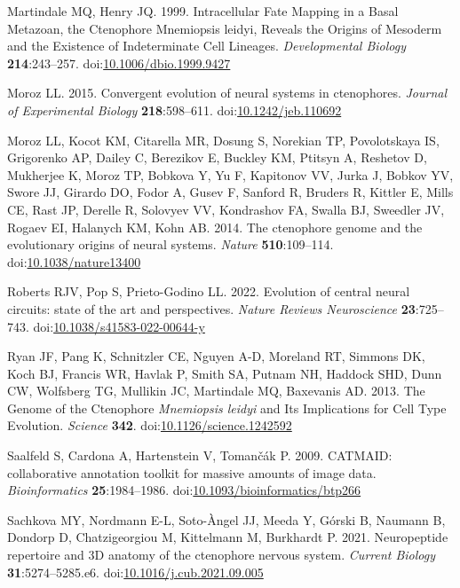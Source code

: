 \documentclass[
  11pt,
]{article}
\newlength{\cslhangindent}
\newenvironment{CSLReferences}[2] %
 {\begin{list}{}{%
  \setlength{\itemindent}{0pt}
  \setlength{\leftmargin}{0pt}
  \setlength{\parsep}{0pt}
  \ifodd #1
   \setlength{\leftmargin}{\cslhangindent}
   \setlength{\itemindent}{-1\cslhangindent}
  \fi
  \setlength{\itemsep}{#2\baselineskip}}}
 {\end{list}}
\begin{document}
\begin{CSLReferences}{1}{0}
Martindale MQ, Henry JQ. 1999. Intracellular Fate Mapping in a Basal
Metazoan, the Ctenophore Mnemiopsis leidyi, Reveals the Origins of
Mesoderm and the Existence of Indeterminate Cell Lineages.
\emph{Developmental Biology} \textbf{214}:243--257.
doi:\href{https://doi.org/10.1006/dbio.1999.9427}{10.1006/dbio.1999.9427}

Moroz LL. 2015. Convergent evolution of neural systems in ctenophores.
\emph{Journal of Experimental Biology} \textbf{218}:598--611.
doi:\href{https://doi.org/10.1242/jeb.110692}{10.1242/jeb.110692}

Moroz LL, Kocot KM, Citarella MR, Dosung S, Norekian TP, Povolotskaya
IS, Grigorenko AP, Dailey C, Berezikov E, Buckley KM, Ptitsyn A,
Reshetov D, Mukherjee K, Moroz TP, Bobkova Y, Yu F, Kapitonov VV, Jurka
J, Bobkov YV, Swore JJ, Girardo DO, Fodor A, Gusev F, Sanford R, Bruders
R, Kittler E, Mills CE, Rast JP, Derelle R, Solovyev VV, Kondrashov FA,
Swalla BJ, Sweedler JV, Rogaev EI, Halanych KM, Kohn AB. 2014. The
ctenophore genome and the evolutionary origins of neural systems.
\emph{Nature} \textbf{510}:109--114.
doi:\href{https://doi.org/10.1038/nature13400}{10.1038/nature13400}

Roberts RJV, Pop S, Prieto-Godino LL. 2022. Evolution of central neural
circuits: state of the art and perspectives. \emph{Nature Reviews
Neuroscience} \textbf{23}:725--743.
doi:\href{https://doi.org/10.1038/s41583-022-00644-y}{10.1038/s41583-022-00644-y}

Ryan JF, Pang K, Schnitzler CE, Nguyen A-D, Moreland RT, Simmons DK,
Koch BJ, Francis WR, Havlak P, Smith SA, Putnam NH, Haddock SHD, Dunn
CW, Wolfsberg TG, Mullikin JC, Martindale MQ, Baxevanis AD. 2013. The
Genome of the Ctenophore {\emph{Mnemiopsis leidyi}} and Its Implications
for Cell Type Evolution. \emph{Science} \textbf{342}.
doi:\href{https://doi.org/10.1126/science.1242592}{10.1126/science.1242592}

Saalfeld S, Cardona A, Hartenstein V, Tomančák P. 2009. CATMAID:
collaborative annotation toolkit for massive amounts of image data.
\emph{Bioinformatics} \textbf{25}:1984--1986.
doi:\href{https://doi.org/10.1093/bioinformatics/btp266}{10.1093/bioinformatics/btp266}

Sachkova MY, Nordmann E-L, Soto-Àngel JJ, Meeda Y, Górski B, Naumann B,
Dondorp D, Chatzigeorgiou M, Kittelmann M, Burkhardt P. 2021.
Neuropeptide repertoire and 3D anatomy of the ctenophore nervous system.
\emph{Current Biology} \textbf{31}:5274--5285.e6.
doi:\href{https://doi.org/10.1016/j.cub.2021.09.005}{10.1016/j.cub.2021.09.005}


\end{CSLReferences}
\end{document}
